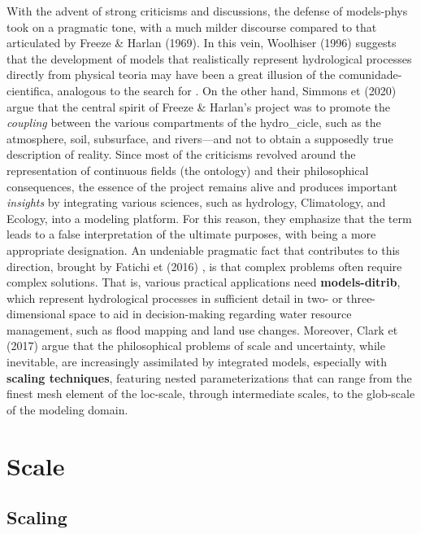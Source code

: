 \documentclass[./main_en.tex]{subfiles}
\begin{document}
\par With the advent of strong criticisms and discussions, the defense of \gls{models-phys} took on a pragmatic tone, with a much milder discourse compared to that articulated by Freeze \& Harlan (1969). In this vein, Woolhiser (1996) \cite{Woolhiser1996a} suggests that the development of models that realistically represent hydrological processes directly from physical \gls{teoria} may have been a great illusion of the \gls{comunidade-cientifica}, analogous to the search for . On the other hand, Simmons et  (2020) \cite{Simmons2020a} argue that the central spirit of Freeze \& Harlan's project was to promote the \textit{coupling} between the various compartments of the \gls{hydro_cicle}, such as the atmosphere, soil, subsurface, and rivers—and not to obtain a supposedly true description of reality. Since most of the criticisms revolved around the representation of continuous fields (the ontology) and their philosophical consequences, the essence of the project remains alive and produces important \textit{insights} by integrating various sciences, such as \gls{hydrology}, Climatology, and Ecology, into a modeling platform. For this reason, they emphasize that the term  leads to a false interpretation of the ultimate purposes, with  being a more appropriate designation. An undeniable pragmatic fact that contributes to this direction, brought by Fatichi et  (2016) \cite{Fatichi2016a}, is that complex problems often require complex solutions. That is, various practical applications need \textbf{\gls{models-ditrib}}, which represent hydrological processes in sufficient detail in two- or three-dimensional space to aid in decision-making regarding water resource management, such as flood mapping and land use changes. Moreover, Clark et  (2017) \cite{Clark2017a} argue that the philosophical problems of scale and uncertainty, while inevitable, are increasingly assimilated by integrated models, especially with \textbf{scaling techniques}, featuring nested parameterizations that can range from the finest mesh element of the \gls{loc-scale}, through intermediate scales, to the \gls{glob-scale} of the modeling domain.
 
\section{Scale} \label{sec:hydro:sim}

\subsection{Scaling}
\end{document}
